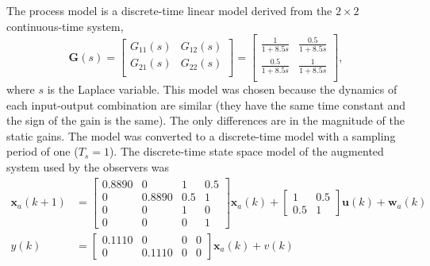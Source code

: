 The process model is a discrete-time linear model derived from the $2\times2$ continuous-time system,
\begin{equation} \label{eq:sim-sys-mimo-ct}
	\mathbf{G}(s) = \left[\begin{array}{cc}
		G_{11}(s) & G_{12}(s)  \\
		G_{21}(s) & G_{22}(s)  \\
	\end{array}\right] = \left[\begin{array}{cc}
		\frac{1}{1+8.5s} & \frac{0.5}{1+8.5s}  \\
		\frac{0.5}{1+8.5s} & \frac{1}{1+8.5s}  \\
	\end{array}\right],
\end{equation}
where $s$ is the Laplace variable.  This model was chosen because the dynamics of each input-output combination are similar (they have the same time constant and the sign of the gain is the same). The only differences are in the magnitude of the static gains. The model was converted to a discrete-time model with a sampling period of one ($T_s=1$). The discrete-time state space model of the augmented system used by the observers was
\begin{equation} \label{eq:sim-sys-2x2-ss-aug}
	\begin{split}
		\mathbf{x}_{a}(k+1) & =\left[\begin{array}{cccc}
			0.8890 & 0 & 1 & 0.5 \\
			0 & 0.8890 & 0.5 & 1 \\
			0 & 0 & 1 & 0 \\
			0 & 0 & 0 & 1
		\end{array}\right] \mathbf{x}_{a}(k) + \left[\begin{array}{cc}
			1 & 0.5 \\
			0.5 & 1
		\end{array}\right] \mathbf{u}(k) + \mathbf{w}_{a}(k) \\
		y(k) & =\left[\begin{array}{cccc}
			0.1110 & 0 & 0 & 0 \\
			0 & 0.1110 & 0 & 0
		\end{array}\right] \mathbf{x}_{a}(k) + v(k)
	\end{split}
\end{equation}
